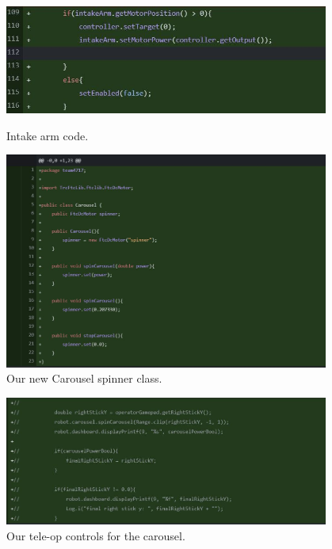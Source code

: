 \begin{figure}[ht]
\centering
\begin{minipage}[b]{.48\textwidth}
  \centering
  \includegraphics[width=0.95\textwidth]{Meetings/November/11-01-21/armMonday1 - Ritam R.JPG}
  \caption{Intake arm code.}
  \label{fig:pic1}
\end{minipage}%
\hfill%
\begin{minipage}[b]{.48\textwidth}
  \centering
  \includegraphics[width=0.95\textwidth]{Meetings/November/11-01-21/carousel1 - Ritam R.JPG}
  \caption{Our new Carousel spinner class.}
  \label{fig:pic2}
\end{minipage}
\end{figure}

\begin{figure}[htp]
\centering
\includegraphics[width=0.95\textwidth, angle=0]{Meetings/November/11-01-21/carousel2 - Ritam R.JPG}
\caption{Our tele-op controls for the carousel.}
\label{fig:pic3}
\end{figure}


